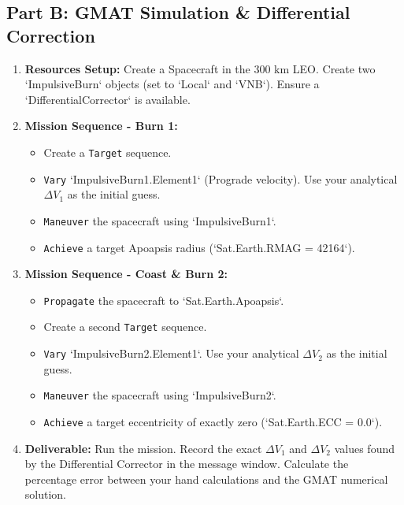 \documentclass[11pt, letterpaper]{article}
\begin{document}
\subsection*{Part B: GMAT Simulation \& Differential Correction}
\begin{enumerate}
    \item \textbf{Resources Setup:} Create a Spacecraft in the 300 km LEO. Create two `ImpulsiveBurn` objects (set to `Local` and `VNB`). Ensure a `DifferentialCorrector` is available.
    \item \textbf{Mission Sequence - Burn 1:} 
        \begin{itemize}
            \item Create a \texttt{Target} sequence.
            \item \texttt{Vary} `ImpulsiveBurn1.Element1` (Prograde velocity). Use your analytical $\Delta V_1$ as the initial guess.
            \item \texttt{Maneuver} the spacecraft using `ImpulsiveBurn1`.
            \item \texttt{Achieve} a target Apoapsis radius (`Sat.Earth.RMAG = 42164`).
        \end{itemize}
    \item \textbf{Mission Sequence - Coast \& Burn 2:}
        \begin{itemize}
            \item \texttt{Propagate} the spacecraft to `Sat.Earth.Apoapsis`.
            \item Create a second \texttt{Target} sequence.
            \item \texttt{Vary} `ImpulsiveBurn2.Element1`. Use your analytical $\Delta V_2$ as the initial guess.
            \item \texttt{Maneuver} the spacecraft using `ImpulsiveBurn2`.
            \item \texttt{Achieve} a target eccentricity of exactly zero (`Sat.Earth.ECC = 0.0`).
        \end{itemize}
    \item \textbf{Deliverable:} Run the mission. Record the exact $\Delta V_1$ and $\Delta V_2$ values found by the Differential Corrector in the message window. Calculate the percentage error between your hand calculations and the GMAT numerical solution.
\end{enumerate}

\end{document}
